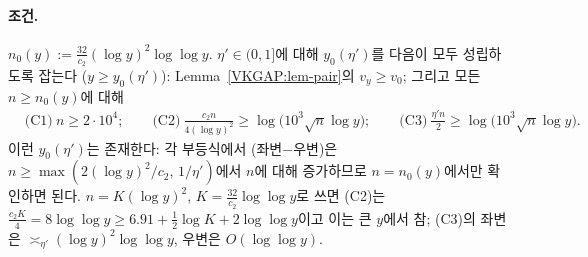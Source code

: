 \paragraph{조건.} $n_0(y):=\frac{32}{c_2}(\log y)^2\log\log y$. $\eta'\in(0,1]$에 대해 $y_0(\eta')$를 다음이 모두 성립하도록 잡는다
($y\ge y_0(\eta')$): Lemma~\ref{VKGAP:lem-pair}의 $v_y\ge v_0$; 그리고 모든 $n\ge n_0(y)$에 대해
\begin{align*}
&\text{(C1)}\ n\ge2\cdot10^4;\qquad
\text{(C2)}\ \frac{c_2n}{4(\log y)^2}\ge\log\big(10^3\sqrt n\log y\big);\qquad
\text{(C3)}\ \frac{\eta'n}{2}\ge\log\big(10^3\sqrt n\log y\big).
\end{align*}
이런 $y_0(\eta')$는 존재한다: 각 부등식에서 (좌변$-$우변)은 $n\ge\max(2(\log y)^2/c_2,\,1/\eta')$에서 $n$에 대해 증가하므로
$n=n_0(y)$에서만 확인하면 된다. $n=K(\log y)^2$, $K=\frac{32}{c_2}\log\log y$로 쓰면 (C2)는
$\frac{c_2K}{4}=8\log\log y\ge 6.91+\frac12\log K+2\log\log y$이고 이는 큰 $y$에서 참; (C3)의 좌변은 $\asymp_{\eta'}(\log y)^2\log\log y$, 우변은 $O(\log\log y)$.

